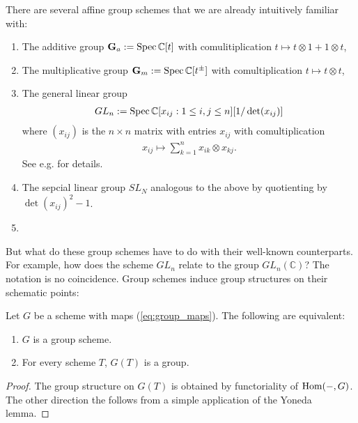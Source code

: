 \documentclass[12pt]{ociamthesis}  %
\begin{document}
\begin{example}\label{ex:group_schemes}
  There are several affine group schemes that we are already
  intuitively familiar with:
  \begin{enumerate}
    \item The additive group $\mathbf{G}_a := \operatorname{Spec}\mathbb C[t]$ with
          comulitiplication $t\mapsto t\otimes 1 + 1\otimes t$,
    \item The multiplicative group $\mathbf{G}_m := \operatorname{Spec}\mathbb C[t^\pm]$
          with comultiplication $t\mapsto t\otimes t$,
    \item The general linear group
          \begin{align*}
            GL_n := \operatorname{Spec}\mathbb C[x_{ij} : 1\leq i,j\leq n][1/\det(x_{ij})]
          \end{align*}
          where $(x_{ij})$ is the $n\times n$ matrix with entries $x_{ij}$
          with comultiplication
          \begin{align*}
            x_{ij} \mapsto \sum_{k=1}^n x_{ik}\otimes x_{kj}.
          \end{align*}
          See e.g. \cite[\href{https://stacks.math.columbia.edu/tag/022W}{Tag 022W}]{stacks-project} for details.
    \item The sepcial linear group $SL_N$ analogous to the above by
          quotienting by $\det(x_{ij})^2 - 1$.
    \item {}
  \end{enumerate}
\end{example}
But what do these group schemes have to do with their well-known
counterparts. For example, how does the scheme $GL_n$ relate to the
group $GL_n(\mathbb{C})$? The notation is no coincidence.
Group schemes induce group structures on their schematic points:
\begin{lemma}
  Let $G$ be a scheme with maps (\ref{eq:group_maps}). The following
  are equivalent:
  \begin{enumerate}
    \item $G$ is a group scheme.
    \item For every scheme $T$, $G(T)$ is a group.
  \end{enumerate}
  \begin{proof}
    The group structure on $G(T)$ is obtained by functoriality of
    $\operatorname{Hom}(-,G)$. The other direction the follows from a simple
    application of the Yoneda lemma.
  \end{proof}
\end{lemma}
\end{document}
